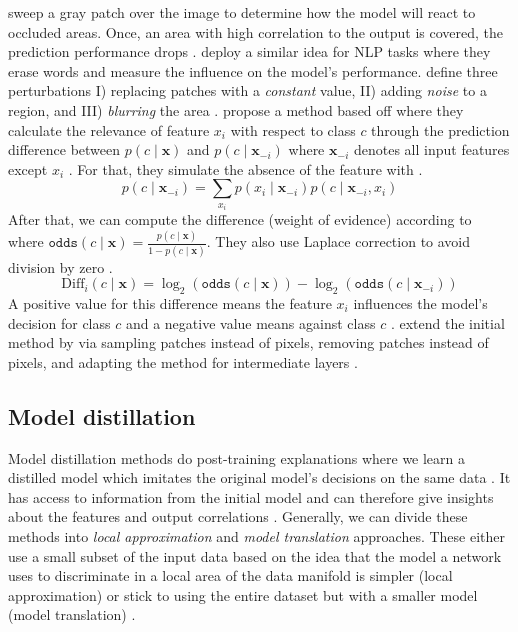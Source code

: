 \citet{ZeilerF14} sweep a gray patch over the image to determine how the model will react to occluded areas. Once, an area with high correlation to the output is covered, the prediction performance drops \citep{xie2020explainable, ZeilerF14}. \citet{li2016understanding} deploy a similar idea for NLP tasks where they erase words and measure the influence on the model's performance. \citet{FongV17} define three perturbations I) replacing patches with a \emph{constant} value, II) adding \emph{noise} to a region, and  III) \emph{blurring} the area \citep{FongV17, xie2020explainable}. \citet{ZintgrafCAW17} propose a method based off \citet{Robnik-SikonjaK08} where they calculate the relevance of feature $x_i$ with respect to class $c$ through the prediction difference between  $p(c \mid \boldsymbol{x})$ and $p(c \mid \boldsymbol{x}_{-i})$ where $\boldsymbol{x}_{-i}$ denotes all input features except $x_i$ \citep{ZintgrafCAW17}. For that, they simulate the absence of the feature with .
\begin{equation}
\label{eq:predict_difference}
    p(c \mid \boldsymbol{x}_{-i}) = \sum_{x_i} p(x_i \mid \boldsymbol{x}_{-i})p(c \mid \boldsymbol{x}_{-i}, x_i)
\end{equation}
After that, we can compute the difference (weight of evidence) according to  where $\texttt{odds}(c \mid \boldsymbol{x}) = \frac{p(c \mid \boldsymbol{x})}{1 - p(c \mid \boldsymbol{x})}$. They also use Laplace correction to avoid division by zero \citep{ZintgrafCAW17}.
\begin{equation}
\label{eq:change}
  \textrm{Diff}_i(c \mid \boldsymbol{x}) = \log_2(\texttt{odds}(c\mid \boldsymbol{x})) - \log_2(\texttt{odds}(c \mid \boldsymbol{x}_{-i}))  
\end{equation}
A positive value for this difference means the feature $x_i$ influences the model's decision for class $c$ and a negative value means against class $c$ \citep{ZintgrafCAW17}. \citet{ZintgrafCAW17} extend the initial method by \citet{Robnik-SikonjaK08} via sampling patches instead of pixels, removing patches instead of pixels, and adapting the method for intermediate layers \citep{xie2020explainable}.


\subsection{Model distillation}
Model distillation methods do post-training explanations where we learn a distilled model which imitates the original model's decisions on the same data \citep{xie2020explainable}. It has access to information from the initial model and can therefore give insights about the features and output correlations \citep{xie2020explainable}. Generally, we can divide these methods into \emph{local approximation} and \emph{model translation} approaches. These either use a small subset of the input data based on the idea that the model a network uses to discriminate in a local area of the data manifold is simpler (local approximation) or stick to using the entire dataset but with a smaller model (model translation) \citep{xie2020explainable}. 


